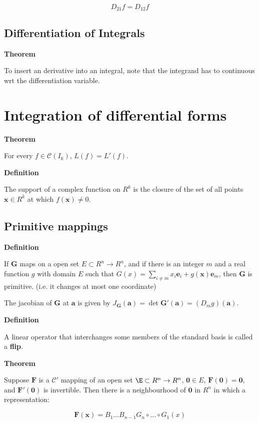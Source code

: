 \documentclass[11pt]{article}
\begin{document}
\[
D_{21} f = D_{12} f
\]

\subsection{Differentiation of Integrals}
\label{sec:org3fa0a8c}


\textbf{Theorem}

To insert an derivative into an integral, note that the integrand has to continuous wrt the differentiation variable.

\section{Integration of differential forms}
\label{sec:org38df169}

\textbf{Theorem}

For every \(f\in\mathcal{C}(I_k)\), \(L(f) = L'(f)\).

\textbf{Definition}

The support of a complex function on \(R^k\) is the closure of the set of all points \(\bm{x} \in R^k\) at which \(f(\bm{x})\neq 0\).

\subsection{Primitive mappings}
\label{sec:org498fbaf}

\textbf{Definition}

If \(\bm{G}\) maps on a open set \(E \subset R^n \to R^n\), and if there is an integer \(m\) and a real function \(g\) with domain \(E\) such that \(G(x) = \sum_{i\neq m} x_i \bm{e}_i + g(\bm{x})\bm{e}_m\), then \(\bm{G}\) is primitive. (i.e. it changes at most one coordinate)

The jacobian of \(\bm{G}\) at \(\bm{a}\) is given by \(J_{\bm{G}} (\bm{a}) = \det \bm{G}'(\bm{a}) = (D_m g)(\bm{a})\).

\textbf{Definition}

A linear operator that interchanges some members of the standard basis is called a \textbf{flip}.

\textbf{Theorem}

Suppose \(\bm{F}\) is a \(\mathcal{C}'\) mapping of an open set \(\E \subset R^n \to R^n\), \(\bm{0} \in E\), \(\bm{F(0)=0}\), and \(\bm{F'(0)}\) is invertible. Then there is a neighbourhood of \(\bm{0}\) in \(R^n\) in which a representation:

\[
\bm{F(x)} = B_1\ldots B_{n-1} G_n \circ\ldots\circ G_1 (x)
\]
\end{document}
